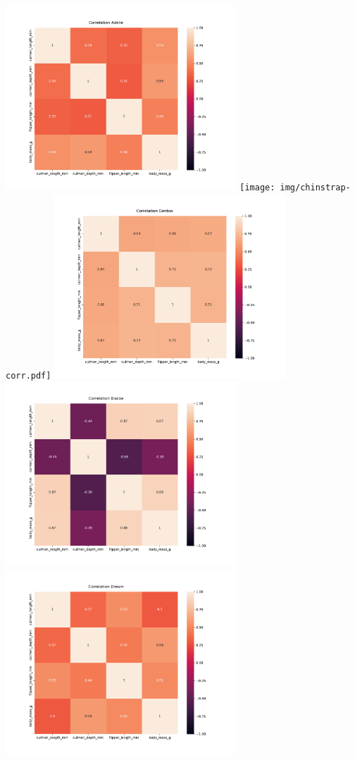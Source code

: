 \documentclass[10pt,xcolor=pdflatex,dvipsnames,table,oneside]{book}
\begin{document}
\vspace{1em}
\includegraphics[width=0.65\textwidth, angle = 0]{img/adelie-corr.pdf}
\texttt{[image: img/chinstrap-corr.pdf]}
\includegraphics[width=0.65\textwidth, angle = 0]{img/gentoo-corr.pdf}
\includegraphics[width=0.65\textwidth, angle = 0]{img/biscoe-corr.pdf}
\includegraphics[width=0.65\textwidth, angle = 0]{img/dream-corr.pdf}
\end{document}
